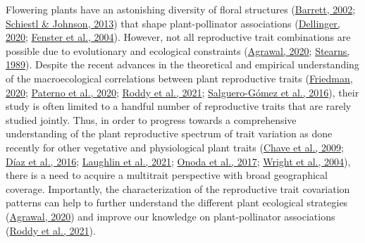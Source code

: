 \documentclass[
  12pt,
  a4paper,
]{article}
\begin{document}
Flowering plants have an astonishing diversity of floral structures (\protect\hyperlink{ref-barrett2002}{Barrett, 2002}; \protect\hyperlink{ref-schiestl2013}{Schiestl \& Johnson, 2013}) that shape plant-pollinator associations (\protect\hyperlink{ref-dellinger2020}{Dellinger, 2020}; \protect\hyperlink{ref-fenster2004}{Fenster et al., 2004}). However, not all reproductive trait combinations are possible due to evolutionary and ecological constraints (\protect\hyperlink{ref-agrawal2020}{Agrawal, 2020}; \protect\hyperlink{ref-stearns1989}{Stearns, 1989}). Despite the recent advances in the theoretical and empirical understanding of the macroecological correlations between plant reproductive traits (\protect\hyperlink{ref-friedman2020}{Friedman, 2020}; \protect\hyperlink{ref-paterno2020}{Paterno et al., 2020}; \protect\hyperlink{ref-roddy2021}{Roddy et al., 2021}; \protect\hyperlink{ref-salguero2016}{Salguero-Gómez et al., 2016}), their study is often limited to a handful number of reproductive traits that are rarely studied jointly. Thus, in order to progress towards a comprehensive understanding of the plant reproductive spectrum of trait variation as done recently for other vegetative and physiological plant traits (\protect\hyperlink{ref-chave2009}{Chave et al., 2009}; \protect\hyperlink{ref-diaz2016}{Díaz et al., 2016}; \protect\hyperlink{ref-laughlin2021}{Laughlin et al., 2021}; \protect\hyperlink{ref-onoda2017}{Onoda et al., 2017}; \protect\hyperlink{ref-wright2004}{Wright et al., 2004}), there is a need to acquire a multitrait perspective with broad geographical coverage. Importantly, the characterization of the reproductive trait covariation patterns can help to further understand the different plant ecological strategies (\protect\hyperlink{ref-agrawal2020}{Agrawal, 2020}) and improve our knowledge on plant-pollinator associations (\protect\hyperlink{ref-roddy2021}{Roddy et al., 2021}).
\end{document}
